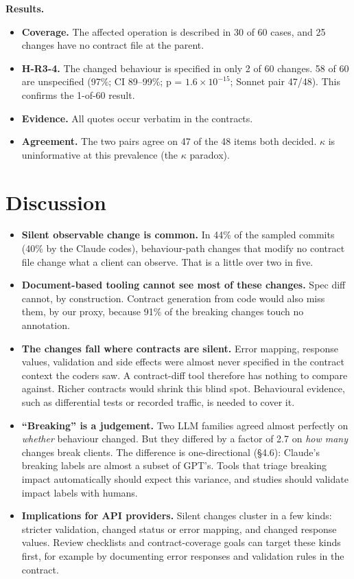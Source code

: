\documentclass[conference]{IEEEtran}
\begin{document}
\textbf{Results.}
\begin{itemize}
\item \textbf{Coverage.} The affected operation is described in 30 of 60 cases, and 25 changes have no contract file at the parent.
\item \textbf{H-R3-4.} The changed behaviour is specified in only 2 of 60 changes. 58 of 60 are unspecified (97\%; CI 89--99\%; p = $1.6 \times 10^{-15}$; Sonnet pair 47/48). This confirms the 1-of-60 result.
\item \textbf{Evidence.} All quotes occur verbatim in the contracts.
\item \textbf{Agreement.} The two pairs agree on 47 of the 48 items both decided. $\kappa$ is uninformative at this prevalence (the $\kappa$ paradox).
\end{itemize}

\section{Discussion}
\begin{itemize}
\item \textbf{Silent observable change is common.} In 44\% of the sampled commits (40\% by the Claude codes), behaviour-path changes that modify no contract file change what a client can observe. That is a little over two in five.
\item \textbf{Document-based tooling cannot see most of these changes.} Spec diff cannot, by construction. Contract generation from code would also miss them, by our proxy, because 91\% of the breaking changes touch no annotation.
\item \textbf{The changes fall where contracts are silent.} Error mapping, response values, validation and side effects were almost never specified in the contract context the coders saw. A contract-diff tool therefore has nothing to compare against. Richer contracts would shrink this blind spot. Behavioural evidence, such as differential tests or recorded traffic, is needed to cover it.
\item \textbf{``Breaking'' is a judgement.} Two LLM families agreed almost perfectly on \emph{whether} behaviour changed. But they differed by a factor of 2.7 on \emph{how many} changes break clients. The difference is one-directional (\S{}4.6): Claude's breaking labels are almost a subset of GPT's. Tools that triage breaking impact automatically should expect this variance, and studies should validate impact labels with humans.
\item \textbf{Implications for API providers.} Silent changes cluster in a few kinds: stricter validation, changed status or error mapping, and changed response values. Review checklists and contract-coverage goals can target these kinds first, for example by documenting error responses and validation rules in the contract.
\end{itemize}
\end{document}

